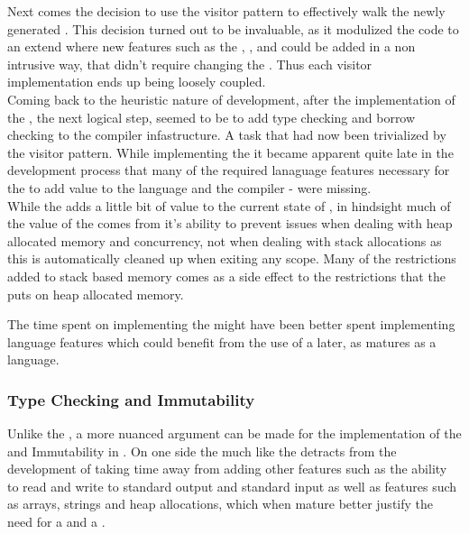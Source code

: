 Next comes the decision to use the visitor pattern to effectively walk the newly
generated \ast{}. This decision turned out to be invaluable, as it modulized the code
to an extend where new features such as the \typeChecker, \borrowChecker{}, and
\codeGen{} could be added in a non intrusive way, that didn't require changing the
\ast. Thus each visitor implementation ends up being loosely coupled. \\

Coming back to the heuristic nature of development, after the implementation of the
\codeGen, the next logical step, seemed to be to add type checking and borrow checking
to the compiler infastructure. A task that had now been trivialized by the visitor
pattern. While implementing the \borrowChecker{} it became apparent quite late in
the development process that many of the required lanaguage features necessary for
the \borrowChecker{} to add value to the language and the compiler - were missing. \\

While the \borrowChecker{} adds a little bit of value to the current state of
\lang{},
in hindsight much of the value of the \borrowChecker{} comes from it's ability to
prevent issues when dealing with heap allocated memory and concurrency, not when
dealing with stack allocations as this is automatically cleaned up when exiting any
scope. Many of the restrictions added to stack based memory comes as a side
effect to the restrictions that the \borrowChecker{} puts on heap allocated memory. 

The time spent on implementing the \borrowChecker{} might have been better
spent implementing language features which could benefit from the use of a
\borrowChecker{} later, as \lang{} matures as a language.

\subsubsection{Type Checking and Immutability}

Unlike the \borrowChecker, a more nuanced argument can be made for the
implementation of the \typeChecker{} and Immutability in \lang. On one side the
\typeChecker{} much like the \borrowChecker{} detracts from the development of
\lang{} taking time away from adding other features such as the ability
to read and write to standard output and standard input as well as features such as
arrays, strings and heap allocations, which when mature better justify the need for a
\typeChecker{} and a \borrowChecker. \\ 

